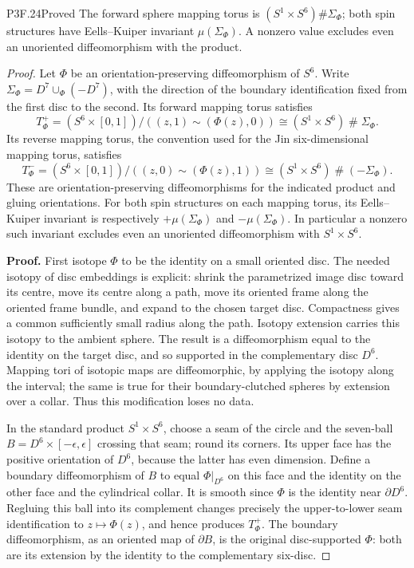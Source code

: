 \begin{statement}{P3F.24}{Proved}
The forward sphere mapping torus is $(S^1\times S^6)\#\Sigma_\Phi$; both spin structures have Eells--Kuiper invariant $\mu(\Sigma_\Phi)$. A nonzero value excludes even an unoriented diffeomorphism with the product.
\end{statement}
\begin{proof}
Let \(\Phi\) be an orientation-preserving diffeomorphism of \(S^6\). Write \(\Sigma_\Phi=D^7\cup_\Phi(-D^7)\), with the direction of the boundary identification fixed from the first disc to the second. Its forward mapping torus satisfies \[
 T^+_\Phi=(S^6\times[0,1])/((z,1)\sim(\Phi(z),0))
       \cong(S^1\times S^6)\mathbin{\#}\Sigma_\Phi.   \tag{P3F.24.1}
\] Its reverse mapping torus, the convention used for the Jin six-dimensional mapping torus, satisfies \[
 T^-_\Phi=(S^6\times[0,1])/((z,0)\sim(\Phi(z),1))
       \cong(S^1\times S^6)\mathbin{\#}(-\Sigma_\Phi).\tag{P3F.24.2}
\] These are orientation-preserving diffeomorphisms for the indicated product and gluing orientations. For both spin structures on each mapping torus, its Eells--Kuiper invariant is respectively \(+\mu(\Sigma_\Phi)\) and \(-\mu(\Sigma_\Phi)\). In particular a nonzero such invariant excludes even an unoriented diffeomorphism with \(S^1\times S^6\).

\textbf{Proof.} First isotope \(\Phi\) to be the identity on a small oriented disc. The needed isotopy of disc embeddings is explicit: shrink the parametrized image disc toward its centre, move its centre along a path, move its oriented frame along the oriented frame bundle, and expand to the chosen target disc. Compactness gives a common sufficiently small radius along the path. Isotopy extension carries this isotopy to the ambient sphere. The result is a diffeomorphism equal to the identity on the target disc, and so supported in the complementary disc \(D^6\). Mapping tori of isotopic maps are diffeomorphic, by applying the isotopy along the interval; the same is true for their boundary-clutched spheres by extension over a collar. Thus this modification loses no data.

In the standard product \(S^1\times S^6\), choose a seam of the circle and the seven-ball \(B=D^6\times[-\epsilon,\epsilon]\) crossing that seam; round its corners. Its upper face has the positive orientation of \(D^6\), because the latter has even dimension. Define a boundary diffeomorphism of \(B\) to equal \(\Phi|_{D^6}\) on this face and the identity on the other face and the cylindrical collar. It is smooth since \(\Phi\) is the identity near \(\partial D^6\). Regluing this ball into its complement changes precisely the upper-to-lower seam identification to \(z\mapsto\Phi(z)\), and hence produces \(T^+_\Phi\). The boundary diffeomorphism, as an oriented map of \(\partial B\), is the original disc-supported \(\Phi\): both are its extension by the identity to the complementary six-disc.


\end{proof}
